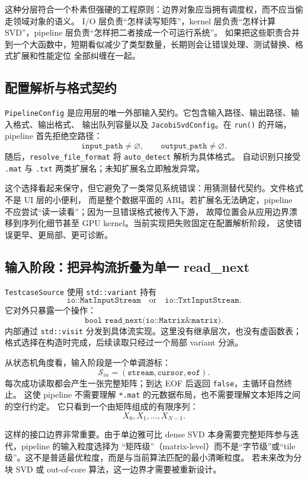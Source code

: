 这种分层符合一个朴素但强硬的工程原则：边界对象应当拥有调度权，而不应当偷走领域对象的语义。
I/O 层负责“怎样读写矩阵”，kernel 层负责“怎样计算 SVD”，pipeline 层负责“怎样把二者接成一个可运行系统”。
如果把这些职责合并到一个大函数中，短期看似减少了类型数量，长期则会让错误处理、测试替换、格式扩展和性能定位
全部纠缠在一起。

\subsection{配置解析与格式契约}

\texttt{PipelineConfig} 是应用层的唯一外部输入契约。它包含输入路径、输出路径、输入格式、输出格式、
输出队列容量以及 \texttt{JacobiSvdConfig}。在 \texttt{run()} 的开端，pipeline 首先拒绝空路径：
\[
    \texttt{input\_path}\ne\varnothing,\qquad
    \texttt{output\_path}\ne\varnothing.
\]
随后，\texttt{resolve\_file\_format} 将 \texttt{auto\_detect} 解析为具体格式。
自动识别只接受 \texttt{.mat} 与 \texttt{.txt} 两类扩展名；未知扩展名立即触发异常。

这个选择看起来保守，但它避免了一类常见系统错误：用猜测替代契约。文件格式不是 UI 层的小便利，
而是整个数据平面的 ABI。若扩展名无法确定，pipeline 不应尝试“读一读看”；因为一旦错误格式被传入下游，
故障位置会从应用边界漂移到序列化细节甚至 GPU kernel。当前实现把失败固定在配置解析阶段，
这使错误更早、更局部、更可诊断。

\subsection{输入阶段：把异构流折叠为单一 read\_next}

\texttt{TestcaseSource} 使用 \texttt{std::variant} 持有
\[
    \texttt{io::MatInputStream}
    \quad\text{or}\quad
    \texttt{io::TxtInputStream}.
\]
它对外只暴露一个操作：
\[
    \texttt{bool read\_next(io::Matrix\& matrix)}.
\]
内部通过 \texttt{std::visit} 分发到具体流实现。这里没有继承层次，也没有虚函数表；
格式选择在构造时完成，后续读取只经过一个局部 variant 分派。

从状态机角度看，输入阶段是一个单调游标：
\[
    \mathcal{S}_{in}
    =
    (\texttt{stream},\texttt{cursor},\texttt{eof}).
\]
每次成功读取都会产生一张完整矩阵；到达 EOF 后返回 \texttt{false}，主循环自然终止。
这使 pipeline 不需要理解 \texttt{*.mat} 的元数据布局，也不需要理解文本矩阵之间的空行约定。
它只看到一个由矩阵组成的有限序列：
\[
    X_0,X_1,\ldots,X_{N-1}.
\]

这样的接口边界非常重要。由于单边雅可比 dense SVD 本身需要完整矩阵参与迭代，pipeline 的输入粒度选择为
“矩阵级”（matrix-level）而不是“字节级”或“tile 级”。这不是普适最优粒度，而是与当前算法匹配的最小清晰粒度。
若未来改为分块 SVD 或 out-of-core 算法，这一边界才需要被重新设计。

